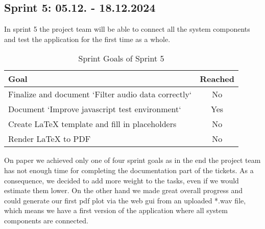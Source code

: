 \subsection{Sprint 5: 05.12. - 18.12.2024}\label{subsec:sprint-5}
In sprint 5 the project team will be able to connect all the system components and test the application for the first time as a whole.
\begin{table}[H]
    \centering
    \begin{tabularx}{\textwidth}{X c}
        \toprule
        \textbf{Goal}                                         & \textbf{Reached} \\
        \midrule
        Finalize and document `Filter audio data correctly`   & No               \\
        \midrule
        Document `Improve javascript test environment`        & Yes              \\
        \midrule
        Create LaTeX template and fill in placeholders        & No               \\
        \midrule
        Render LaTeX to PDF                                   & No               \\
        \bottomrule
    \end{tabularx}
    \caption{Sprint Goals of Sprint 5}\label{tab:sprint_goals5}
\end{table}
On paper we achieved only one of four sprint goals as in the end the project team has not enough time for completing
the documentation part of the tickets.
As a consequence, we decided to add more weight to the tasks, even if we would estimate them lower.
On the other hand we made great overall progress and could generate our first pdf plot via the web gui from an uploaded
*.wav file, which means we have a first version of the application where all system components are connected.

